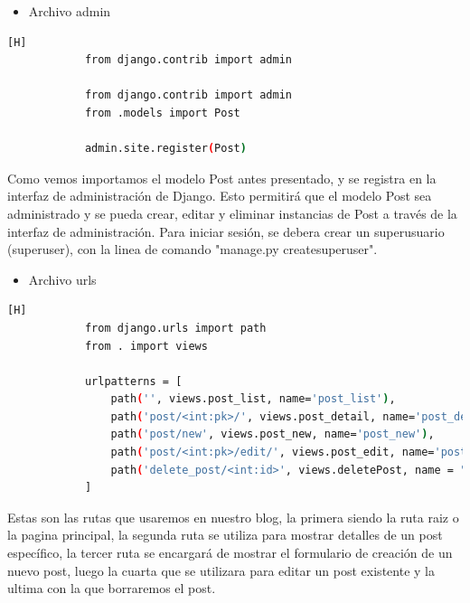 \documentclass{article}
\begin{document}
        \begin{itemize}	
    		\item Archivo admin
        \end{itemize}
        
        \begin{lstlisting}[language=bash,caption={admin.py}][H]
            from django.contrib import admin

            from django.contrib import admin
            from .models import Post
            
            admin.site.register(Post)
	\end{lstlisting}
    Como vemos importamos el modelo Post antes presentado, y se registra en la interfaz de administración de Django. Esto permitirá que el modelo Post sea administrado y se pueda crear, editar y eliminar instancias de Post a través de la interfaz de administración. Para iniciar sesión, se debera crear un superusuario (superuser), con la linea de comando "manage.py createsuperuser".

        \begin{itemize}	
    		\item Archivo urls
        \end{itemize}
        
        \begin{lstlisting}[language=bash,caption={urls.py}][H] 
            from django.urls import path
            from . import views
            
            urlpatterns = [
                path('', views.post_list, name='post_list'),
                path('post/<int:pk>/', views.post_detail, name='post_detail'),
                path('post/new', views.post_new, name='post_new'),
                path('post/<int:pk>/edit/', views.post_edit, name='post_edit'),
                path('delete_post/<int:id>', views.deletePost, name = "delete_post")
            ]
	\end{lstlisting}
    Estas son las rutas que usaremos en nuestro blog, la primera siendo la ruta raiz o la pagina principal, la segunda ruta se utiliza para mostrar detalles de un post específico, la tercer ruta se encargará de mostrar el formulario de creación de un nuevo post, luego la cuarta que se utilizara  para editar un post existente y la ultima con la que borraremos el post.
\end{document}
